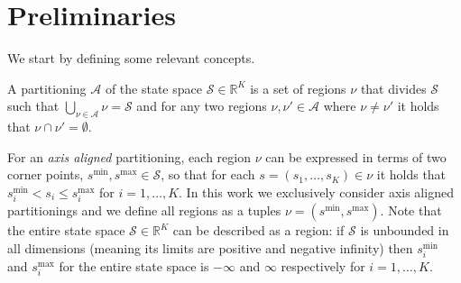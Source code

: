 \section{Preliminaries}%
\label{sec:preliminaries}

We start by defining some relevant concepts.




\begin{definition}[Partitionings]%
\label{def:partitioning}
    A partitioning $\mathcal{A}$ of the state space $\mathcal{S} \in
    \mathbb{R}^K$ is a set of regions $\nu$ that divides $\mathcal{S}$ such that
    $\bigcup_{\nu \in \mathcal{A}}\nu = \mathcal{S}$ and for any two regions
    $\nu, \nu' \in \mathcal{A}$ where $\nu \neq \nu'$ it holds that $\nu \cap
    \nu' = \emptyset$.
\end{definition}

\noindent
For an \textit{axis aligned} partitioning, each region $\nu$ can be expressed in
terms of two corner points, $s^{\min}, s^{\max} \in \mathcal{S}$, so that for
each $s = (s_1, \ldots, s_K) \in \nu$ it holds that $s^{\min}_i < s_i \le
s^{\max}_i$ for $i = 1,\ldots,K$. In this work we exclusively consider axis
aligned partitionings and we define all regions as a tuples $\nu = (s^{\min},
s^{\max})$. Note that the entire state space $\mathcal{S} \in \mathbb{R}^K$ can
be described as a region: if $\mathcal{S}$ is unbounded in all dimensions
(meaning its limits are positive and negative infinity) then $s^{\min}_i$ and
$s^{\max}_i$ for the entire state space is $-\infty$ and $\infty$ respectively
for $i = 1,\ldots,K$.



